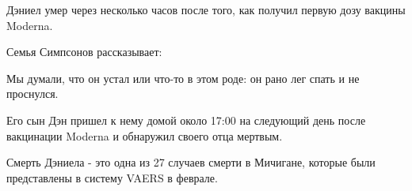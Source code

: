 Дэниел умер через несколько часов после того, как получил первую дозу вакцины
Moderna.

Семья Симпсонов рассказывает:

Мы думали, что он устал или что-то в этом роде: он рано лег спать и не
проснулся.

Его сын Дэн пришел к нему домой около 17:00 на следующий день после вакцинации
Moderna и обнаружил своего отца мертвым.

Смерть Дэниела - это одна из 27 случаев смерти в Мичигане, которые были
представлены в систему VAERS в феврале.

